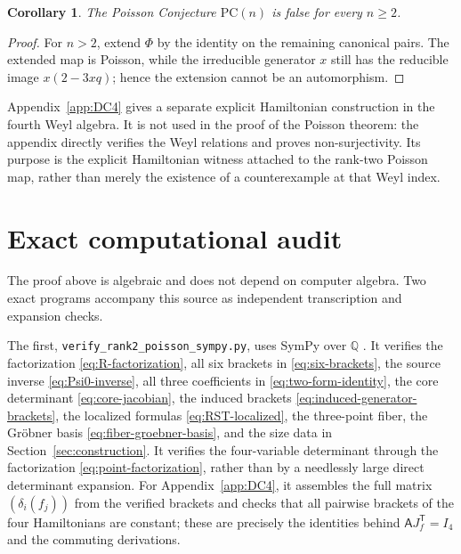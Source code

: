 \documentclass[11pt]{article}
\newcommand{\Q}{\mathbb Q}
\newcommand{\PC}{\mathrm{PC}}
\newtheorem{corollary}[theorem]{Corollary}
\theoremstyle{remark}
\begin{document}
\begin{corollary}\label{cor:all-poisson-ranks}
The Poisson Conjecture \(\PC(n)\) is false for every \(n\geq2\).
\end{corollary}

\begin{proof}
For \(n>2\), extend \(\Phi\) by the identity on the remaining canonical
pairs.  The extended map is Poisson, while the irreducible generator \(x\)
still has the reducible image \(x(2-3xq)\); hence the extension cannot be an
automorphism.
\end{proof}

Appendix~\ref{app:DC4} gives a separate explicit Hamiltonian construction in
the fourth Weyl algebra.  It is not used in the proof of the Poisson theorem:
the appendix directly verifies the Weyl relations and proves non-surjectivity.
Its purpose is the explicit Hamiltonian witness attached to the rank-two
Poisson map, rather than merely the existence of a counterexample at that Weyl
index.

\section{Exact computational audit}\label{sec:verification}

The proof above is algebraic and does not depend on computer algebra.  Two
exact programs accompany this source as independent transcription and
expansion checks.

The first, \texttt{verify\_rank2\_poisson\_sympy.py}, uses SymPy over
\(\Q\) \cite{SymPy}.  It verifies the factorization
\eqref{eq:R-factorization}, all six brackets in \eqref{eq:six-brackets}, the
source inverse \eqref{eq:Psi0-inverse}, all three coefficients in
\eqref{eq:two-form-identity}, the core determinant
\eqref{eq:core-jacobian}, the induced brackets
\eqref{eq:induced-generator-brackets}, the localized formulas
\eqref{eq:RST-localized}, the three-point fiber, the Gr\"obner basis
\eqref{eq:fiber-groebner-basis}, and the size data in
Section~\ref{sec:construction}.  It verifies the four-variable determinant
through the factorization \eqref{eq:point-factorization}, rather than by a
needlessly large direct determinant expansion.  For Appendix~\ref{app:DC4},
it assembles the full matrix \((\delta_i(f_j))\) from the verified brackets
and checks that all pairwise brackets of the four Hamiltonians are constant;
these are precisely the identities behind
\(\mathsf A J_f^{\mathsf T}=I_4\) and the commuting derivations.
\end{document}
